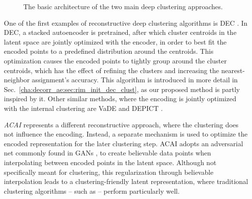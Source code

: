 			\begin{figure}[ht]
				\centering
				\hspace{0.06\linewidth}%
				\caption[Reconstructive and generative deep clustering architectures]{The basic architecture of the two main deep clustering approaches.}
				\label{fig:clust_topo}
			\end{figure}
			
			One of the first examples of reconstructive deep clustering algorithms is \ac{DEC} \cite{dec}.
			In \ac{DEC}, a stacked autoencoder is pretrained, after which cluster centroids in the latent space are jointly optimized with the encoder, in order to best fit the encoded points to a predefined distribution around the centroids.
			This optimization causes the encoded points to tightly group around the cluster centroids, which has the effect of refining the clusters and increasing the nearest-neighbor assignment's accuracy. 
			This algorithm is introduced in more detail in Sec.~\ref{cha:decorr_ae:sec:rim_init_dec_clust}, as our proposed method is partly inspired by it.
			Other similar methods, where the encoding is jointly optimized with the internal clustering are \ac{VaDE} \cite{vade} and \ac{DEPICT} \cite{depict}.
			
			\textit{\ac{ACAI}} \cite{acai} represents a different reconstructive approach, where the clustering does not influence the encoding.
			Instead, a separate mechanism is used to optimize the encoded representation for the later clustering step.
			\ac{ACAI} adopts an adversarial net commonly found in \acp{GAN} \cite{gan}, to create believable data points when interpolating between encoded points in the latent space.
			Although not specifically meant for clustering, this regularization through believable interpolation leads to a clustering-friendly latent representation, where traditional clustering algorithms -- such as \kmeans{} -- perform particularly well.
			
